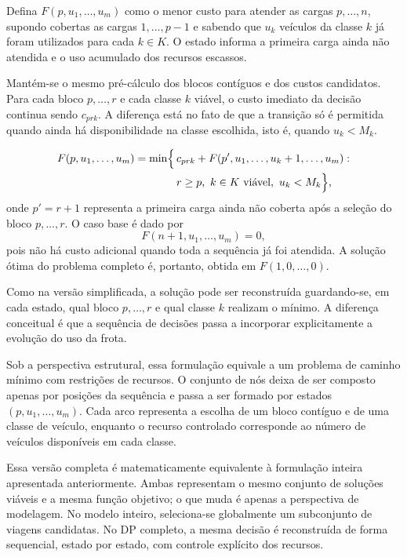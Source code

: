 Defina \(F(p,u_1,\dots,u_m)\) como o menor custo para atender as cargas
\(p,\dots,n\), supondo cobertas as cargas \(1,\dots,p-1\) e sabendo que
\(u_k\) veículos da classe \(k\) já foram utilizados para cada \(k \in K\). O
estado informa a primeira carga ainda não atendida e o uso acumulado dos
recursos escassos.

Mantém-se o mesmo pré-cálculo dos blocos contíguos e dos custos candidatos. Para
cada bloco \(p,\dots,r\) e cada classe \(k\) viável, o custo imediato da decisão
continua sendo \(c_{prk}\). A diferença está no fato de que a transição só é
permitida quando ainda há disponibilidade na classe escolhida, isto é, quando
\(u_k < M_k\).

{
\everymath{\normalcolor}
\[
\begin{aligned}
F(p,u_1,\dots,u_m) = \min \Bigl\{\, & c_{prk} + F(p',u_1,\dots,u_k+1,\dots,u_m) : \\
& r \ge p,\ k \in K \text{ viável},\ u_k < M_k \Bigr\},
\end{aligned}
\]
}
onde \(p' = r+1\) representa a primeira carga ainda não coberta após a seleção
do bloco \(p,\dots,r\). O caso base é dado por
{
\everymath{\normalcolor}
\[
F(n+1,u_1,\dots,u_m) = 0,
\]
}
pois não há custo adicional quando toda a sequência já foi atendida. A solução
ótima do problema completo é, portanto, obtida em
\(F(1,0,\dots,0)\).

Como na versão simplificada, a solução pode ser reconstruída guardando-se, em
cada estado, qual bloco \(p,\dots,r\) e qual classe \(k\) realizam o mínimo. A
diferença conceitual é que a sequência de decisões passa a incorporar
explicitamente a evolução do uso da frota.

Sob a perspectiva estrutural, essa formulação equivale a um problema de caminho
mínimo com restrições de recursos. O conjunto de nós deixa de ser composto apenas
por posições da sequência e passa a ser formado por estados \((p,u_1,\dots,u_m)\).
Cada arco representa a escolha de um bloco contíguo e de uma classe de veículo,
enquanto o recurso controlado corresponde ao número de veículos disponíveis em
cada classe.

Essa versão completa é matematicamente equivalente à formulação inteira
apresentada anteriormente. Ambas representam o mesmo conjunto de soluções
viáveis e a mesma função objetivo; o que muda é apenas a perspectiva de
modelagem. No modelo inteiro, seleciona-se globalmente um subconjunto de viagens
candidatas. No DP completo, a mesma decisão é reconstruída de forma sequencial,
estado por estado, com controle explícito dos recursos.

